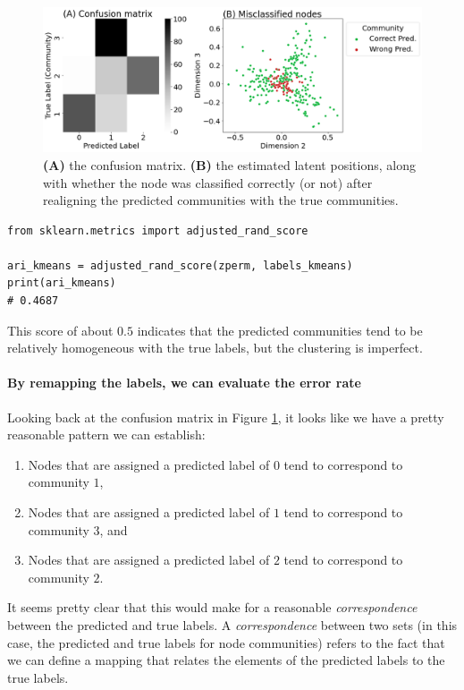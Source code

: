 \begin{figure}[h]
    \centering
    \includegraphics[width=\linewidth]{applications/ch7/Images/comm_detect_eval.png}
    \caption[Community detection clustering evaluation]{\textbf{(A)} the confusion matrix. \textbf{(B)} the estimated latent positions, along with whether the node was classified correctly (or not) after realigning the predicted communities with the true communities.}
    \label{fig:ch7:comm_detect:eval}
\end{figure}

\begin{lstlisting}[style=python]
from sklearn.metrics import adjusted_rand_score

ari_kmeans = adjusted_rand_score(zperm, labels_kmeans)
print(ari_kmeans)
# 0.4687
\end{lstlisting}
This score of about $0.5$ indicates that the predicted communities tend to be relatively homogeneous with the true labels, but the clustering is imperfect.


\paragraph*{By remapping the labels, we can evaluate the error rate}

Looking back at the confusion matrix in Figure \ref{fig:ch7:comm_detect:eval}, it looks like we have a pretty reasonable pattern we can establish:
\begin{enumerate}
    \item Nodes that are assigned a predicted label of $0$ tend to correspond to community $1$, 
    \item Nodes that are assigned a predicted label of $1$ tend to correspond to community $3$, and
    \item Nodes that are assigned a predicted label of $2$ tend to correspond to community $2$.
\end{enumerate}
It seems pretty clear that this would make for a reasonable \textit{correspondence} between the predicted and true labels. A \textit{correspondence} between two sets (in this case, the predicted and true labels for node communities) refers to the fact that we can define a mapping that relates the elements of the predicted labels to the true labels. 

